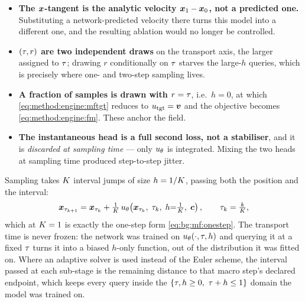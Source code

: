 \begin{itemize}
  \item \textbf{The $\boldsymbol{x}$-tangent is the analytic velocity $\boldsymbol{x}_{1}-\boldsymbol{x}_{0}$, not a
    predicted one.} Substituting a network-predicted velocity there turns this model into a
    different one, and the resulting ablation would no longer be controlled.
  \item \textbf{$(\tau,r)$ are two independent draws} on the transport axis, the larger
    assigned to $\tau$; drawing $r$ conditionally on $\tau$ starves the large-$h$ queries,
    which is precisely where one- and two-step sampling lives.
  \item \textbf{A fraction of samples is drawn with $r = \tau$}, i.e.\ $h=0$, at which
    \eqref{eq:method:engine:mftgt} reduces to $u_{\textrm{tgt}} = \boldsymbol{v}$ and the objective
    becomes \eqref{eq:method:engine:fm}. These anchor the field.
  \item \textbf{The instantaneous head is a full second loss, not a stabiliser}, and it is
    \emph{discarded at sampling time} --- only $u_{\theta}$ is integrated. Mixing the two
    heads at sampling time produced step-to-step jitter.
\end{itemize}

Sampling takes $K$ interval jumps of size $h=1/K$, passing both the position and the
interval:
\begin{equation}\label{eq:method:engine:mfsample}
  \boldsymbol{x}_{\tau_{k+1}} = \boldsymbol{x}_{\tau_{k}}
    + \tfrac{1}{K}\,u_{\theta}\!\left(\boldsymbol{x}_{\tau_{k}},\;\tau_{k},\;h{=}\tfrac{1}{K},\;\boldsymbol{c}\right),
  \qquad \tau_{k} = \tfrac{k}{K},
\end{equation}
which at $K = 1$ is exactly the one-step form \eqref{eq:bg:mf:onestep}. The transport time is
never frozen: the network was trained on $u_{\theta}(\cdot,\tau,h)$ and querying it at a
fixed $\tau$ turns it into a biased $h$-only function, out of the distribution it was fitted
on. Where an adaptive solver is used instead of the Euler scheme, the interval passed at each
sub-stage is the remaining distance to that macro step's declared endpoint, which keeps every
query inside the $\{\tau,h\ge 0,\ \tau+h\le 1\}$ domain the model was trained on.

